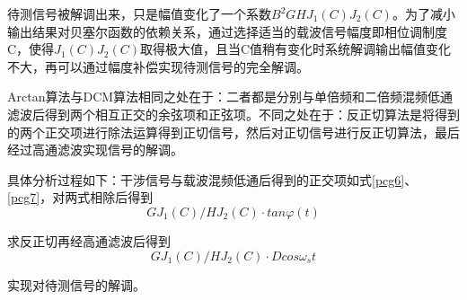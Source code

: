 待测信号被解调出来，只是幅值变化了一个系数$B^{2}GHJ_{1}(C) J_{2}(C)$。为了减小输出结果对贝塞尔函数的依赖关系，通过选择适当的载波信号幅度即相位调制度C，使得$J_1(C)J_2(C)$取得极大值，且当C值稍有变化时系统解调输出幅值变化不大，再可以通过幅度补偿实现待测信号的完全解调。\par
Arctan算法与DCM算法相同之处在于：二者都是分别与单倍频和二倍频混频低通滤波后得到两个相互正交的余弦项和正弦项。不同之处在于：反正切算法是将得到的两个正交项进行除法运算得到正切信号，然后对正切信号进行反正切算法，最后经过高通滤波实现信号的解调。\par
具体分析过程如下：干涉信号与载波混频低通后得到的正交项如式\ref{pcg6}、\ref{pcg7}，对两式相除后得到
\begin{equation}
GJ_1(C)/HJ_2(C)\cdot tan\varphi(t)
\end{equation}


求反正切再经高通滤波后得到
\begin{equation}
GJ_{1}(C)/HJ_{2}(C)\cdot Dcos\omega_{s}t
\end{equation}\par


实现对待测信号的解调。